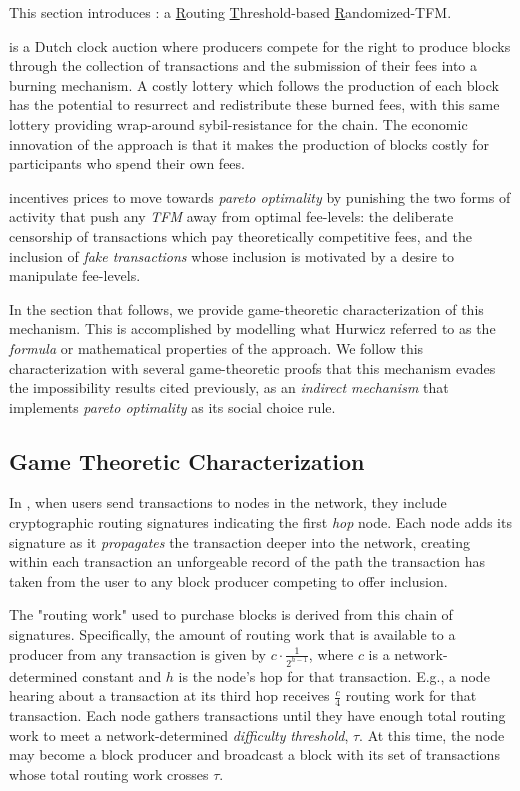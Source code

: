
This section introduces \ourTFM: a \underline{R}outing \underline{T}hreshold-based \underline{R}andomized-TFM.

\ourTFM is a Dutch clock auction where producers compete for the right to produce blocks through the collection of transactions and the submission of their fees into a burning mechanism. A costly lottery which follows the production of each block has the potential to resurrect and redistribute these burned fees, with this same lottery providing wrap-around sybil-resistance for the chain. The economic innovation of the approach is that it makes the production of blocks costly for participants who spend their own fees.

\ourTFM incentives prices to move towards \textit{pareto optimality} by punishing the two forms of activity that push any \textit{TFM} away from optimal fee-levels: the deliberate censorship of transactions which pay theoretically competitive fees, and the inclusion of \textit{fake transactions} whose inclusion is motivated by a desire to manipulate fee-levels.

In the section that follows, we provide game-theoretic characterization of this mechanism. This is accomplished by modelling what Hurwicz referred to as the \textit{formula} or mathematical properties of the approach. We follow this characterization with several game-theoretic proofs that this mechanism evades the impossibility results cited previously, as an \textit{indirect mechanism} that implements \textit{pareto optimality} as its social choice rule.

\subsection{Game Theoretic Characterization}

In \ourTFM, when users send transactions to nodes in the network, they include cryptographic routing signatures indicating the first \emph{hop} node. Each node adds its signature as it \emph{propagates} the transaction deeper into the network, creating within each transaction an unforgeable record of the path the transaction has taken from the user to any block producer competing to offer inclusion.

The "routing work" used to purchase blocks is derived from this chain of signatures. Specifically, the amount of routing work that is available to a producer from any transaction is given by $c\cdot \frac{1}{2^{h-1}}$, where $c$ is a network-determined constant and $h$ is the node's hop for that transaction. E.g., a node hearing about a transaction at its third hop receives $\frac{c}{4}$ routing work for that transaction. Each node gathers transactions until they have enough total routing work to meet a network-determined \textit{difficulty} \textit{threshold}, $\tau$. At this time, the node may become a block producer and broadcast a block with its set of transactions whose total routing work crosses $\tau$.

